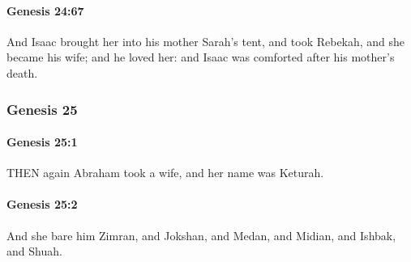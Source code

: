 		\paragraph{Genesis 24:67} %
			\label{GENESIS-24-67}

			And Isaac brought her into his mother Sarah's tent, and took Rebekah, and she became his wife; and he loved her: and Isaac was comforted after his mother's death.


	\subsubsection{Genesis 25} %
		\label{GENESIS-25}
		
		\paragraph{Genesis 25:1} %
			\label{GENESIS-25-1}

			THEN again Abraham took a wife, and her name was Keturah.


		\paragraph{Genesis 25:2} %
			\label{GENESIS-25-2}

			And she bare him Zimran, and Jokshan, and Medan, and Midian, and Ishbak, and Shuah.


